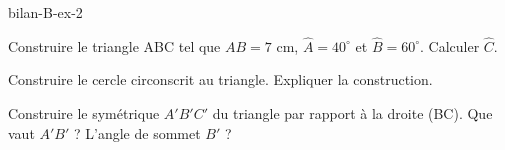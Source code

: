 \begin{blocEdition}{bilan-B-ex-2}
\begin{questions}
\item Construire le triangle ABC tel que $AB=7$ cm, $\widehat{A}=40^\circ$ et $\widehat{B}=60^\circ$. Calculer $\widehat{C}$.
\item Construire le cercle circonscrit au triangle. Expliquer la construction.
\item Construire le symétrique $A'B'C'$ du triangle par rapport à la droite (BC). Que vaut $A'B'$ ? L’angle de sommet $B'$ ?
\end{questions}\label{fig-bilan-B-ex-2}
\par{}\par\par{}\par{}\par{}\par{}\par{}\par{}
\end{blocEdition}
